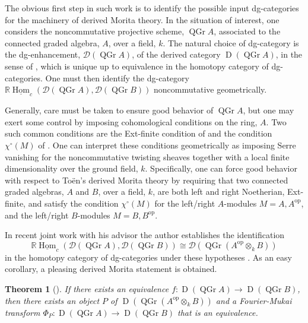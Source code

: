 \documentclass[11pt]{amsart}
\newtheorem{theorem}{Theorem}[section]
\begin{document}
The obvious first step in such work is to identify the possible input dg-categories for the machinery of derived Morita theory.
In the situation of interest, one considers the noncommutative projective scheme, $\operatorname{QGr} A$, associated to the connected graded algebra, $A$, over a field, $k$.%
The natural choice of dg-category is the dg-enhancement, $\mathcal{D}(\operatorname{QGr} A)$, of the derived category $\operatorname{D}(\operatorname{QGr} A)$, in the sense of \cite{Lunts-Orlov}, which is unique up to equivalence in the homotopy category of dg-categories.
One must then identify the dg-category $\mathbb{R}\underline{\operatorname{Hom}}_c(\mathcal{D}(\operatorname{QGr} A), \mathcal{D}(\operatorname{QGr} B))$ noncommutative geometrically.

Generally, care must be taken to ensure good behavior of $\operatorname{QGr} A$, but one may exert some control by imposing cohomological conditions on the ring, $A$.
Two such common conditions are the Ext-finite condition of \cite{BVdB} and the condition $\chi^\circ(M)$ of \cite{AZ94}.
One can interpret these conditions geometrically as imposing Serre vanishing for the noncommutative twisting sheaves together with a local finite dimensionality over the ground field, $k$.
Specifically, one can force good behavior with respect to To\"en's derived Morita theory by requiring that two connected graded algebras, $A$ and $B$, over a field, $k$, are both left and right Noetherian, Ext-finite, and satisfy the condition $\chi^\circ(M)$ for the left/right $A$-modules $M = A, A^{\operatorname{op}}$, and the left/right $B$-modules $M = B, B^{\operatorname{op}}$.

In recent joint work with his advisor the author establishes the identification$$\mathbb{R}\underline{\operatorname{Hom}}_c(\mathcal{D}(\operatorname{QGr} A), \mathcal{D}(\operatorname{QGr} B)) \cong \mathcal{D}(\operatorname{QGr}(A^{\operatorname{op}} \otimes_k B))$$
in the homotopy category of dg-categories under these hypotheses \cite{BF17}.
As an easy corollary, a pleasing derived Morita statement is obtained.
\begin{theorem}[\cite{BF17}]
  If there exists an equivalence
  $f \colon \operatorname{D}(\operatorname{QGr} A) \to \operatorname{D}(\operatorname{QGr} B)$,
  then there exists an object $P$ of $\operatorname{D}\left(\operatorname{QGr} \left(A^{\operatorname{op}} \otimes_k B\right)\right)$ and a Fourier-Mukai transform
  $\Phi_P \colon \operatorname{D}(\operatorname{QGr} A) \to \operatorname{D}(\operatorname{QGr} B)$
  that is an equivalence.
\end{theorem}
\end{document}
